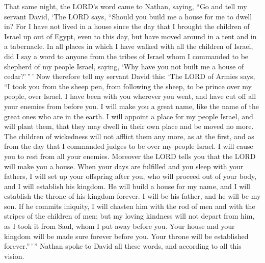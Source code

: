  That same night, the LORD's word came to Nathan, saying,
 ``Go and tell my servant David, `The LORD says, ``Should
you build me a house for me to dwell in?  For I have not
lived in a house since the day that I brought the children of Israel up
out of Egypt, even to this day, but have moved around in a tent and in a
tabernacle.  In all places in which I have walked with all
the children of Israel, did I say a word to anyone from the tribes of
Israel whom I commanded to be shepherd of my people Israel, saying, `Why
have you not built me a house of cedar?'\,''\,'  Now
therefore tell my servant David this: `The LORD of Armies says, ``I took
you from the sheep pen, from following the sheep, to be prince over my
people, over Israel.  I have been with you wherever you
went, and have cut off all your enemies from before you. I will make you
a great name, like the name of the great ones who are in the earth.
 I will appoint a place for my people Israel, and will
plant them, that they may dwell in their own place and be moved no more.
The children of wickedness will not afflict them any more, as at the
first,  and as from the day that I commanded judges to be
over my people Israel. I will cause you to rest from all your enemies.
Moreover the LORD tells you that the LORD will make you a house.
 When your days are fulfilled and you sleep with your
fathers, I will set up your offspring after you, who will proceed out of
your body, and I will establish his kingdom.  He will
build a house for my name, and I will establish the throne of his
kingdom forever.  I will be his father, and he will be my
son. If he commits iniquity, I will chasten him with the rod of men and
with the stripes of the children of men;  but my loving
kindness will not depart from him, as I took it from Saul, whom I put
away before you.  Your house and your kingdom will be
made sure forever before you. Your throne will be established
forever.''\,'\,''  Nathan spoke to David all these words,
and according to all this vision.

